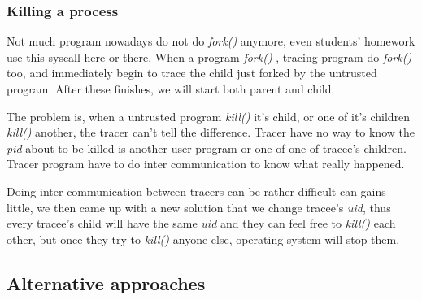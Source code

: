 \documentclass[conference,compsoc]{IEEEtran}
\begin{document}
		\subsubsection{Killing a process}
			\par 
				Not much program nowadays do not do \emph{ fork() } anymore, even students' homework use this syscall here or there. 
				When a program \emph{ fork() }, tracing program do \emph{ fork() } too, and immediately begin to trace the child just forked by the untrusted program. 
				After these finishes, we will start both parent and child.
			\par
				The problem is, when a untrusted program \emph{kill()} it's child, or one of it's children \emph{kill()} another, the tracer can't tell the difference. 
				Tracer have no way to know the \emph{pid} about to be killed is another user program or one of one of tracee's children. 
				Tracer program have to do inter communication to know what really happened.
			\par
				Doing inter communication between tracers can be rather difficult can gains little, we then came up with a new solution that we change tracee's \emph{uid}, thus every tracee's child will have the same \emph{uid} and they can feel free to \emph{kill()} each other, but once they try to \emph{kill()} anyone else, operating system will stop them.
	\subsection {Alternative approaches}
\end{document}
